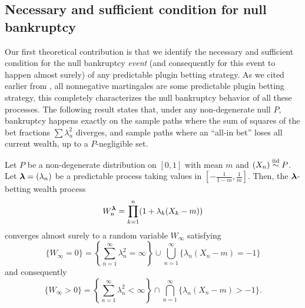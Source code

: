 \subsection{Necessary and sufficient condition for null bankruptcy}

Our first theoretical contribution is that we identify the necessary and sufficient condition for the null bankruptcy \emph{event} (and consequently for this event to happen almost surely) of any predictable plugin betting strategy. As we cited earlier from \cite{waudby2024estimating}, all nonnegative martingales are some predictable plugin betting strategy, this completely characterizes the null bankruptcy behavior of all these processes.
The following result states that,
under any non-degenerate null $P$, bankruptcy happens exactly on the sample paths where the sum of squares of the bet fractions $\sum \lambda_n^2$ diverges, and sample paths where an ``all-in bet'' loses all current wealth, up to a $P$-negligible set.

\begin{theorem}\label{thm:sos-crit} Let $P$ be a non-degenerate distribution on $[0,1]$ with mean $m$ and $(X_n)\overset{\mathrm{iid}}{\sim} P$.
    Let $\boldsymbol{\lambda} = (\lambda_n)$ be a predictable process taking values in $[-\frac{1}{1-m}, \frac{1}{m}]$.
    Then, the $\boldsymbol{\lambda}$-betting wealth process
    \begin{equation}
        W_n^{\boldsymbol{\lambda}}=\prod_{k=1}^n (1 + \lambda_k(X_k - m))
    \end{equation}
    converges almost surely to a random variable $W_\infty$ satisfying
    \begin{equation}
       \{W_\infty = 0 \} = \left\{ \sum_{n=1}^\infty \lambda_n^2 = \infty \right\}  \cup \bigcup_{n=1}^\infty \{ \lambda_n(X_n - m) = -1 \} 
    \end{equation}
    and consequently 
    \begin{equation}
        \{ W_\infty > 0 \} = \left\{ \sum_{n=1}^\infty \lambda_n^2 < \infty \right\} \cap \bigcap_{n=1}^\infty \{ \lambda_n(X_n - m) > -1 \}.
    \end{equation}
\end{theorem}


